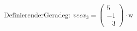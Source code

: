 \documentclass[preview]{standalone}
\begin{document}
\begin{center}
$\mathrm{Definieren der Gerade g: } \: vec{x_3} = \begin{pmatrix} 5 \\ -1 \\ -3 \end{pmatrix} \cdot \mathrm{w}$
\end{center}
\end{document}
